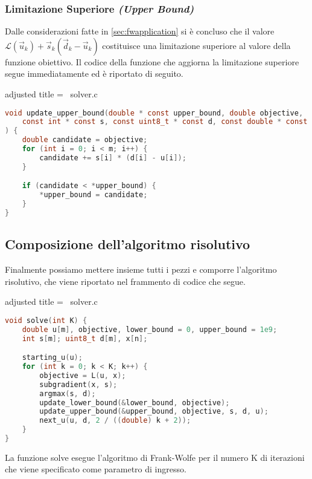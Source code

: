 \subsubsection{Limitazione Superiore \textit{(Upper Bound)}}
Dalle considerazioni fatte in \ref{sec:fwapplication} si è concluso che il valore
\(
    \mathcal{L}(\vec{u}_k) + \vec{s}_k(\vec{d}_k - \vec{u}_k)
\)
costituisce una limitazione superiore al valore della funzione obiettivo. Il codice della funzione che aggiorna la
limitazione superiore segue immediatamente ed è riportato di seguito.

\begin{code}{adjusted title = {\cicon\ solver.c}}
\begin{lstlisting}[language=c, style = style, caption={Aggiornamento della limitazione superiore.}]
void update_upper_bound(double * const upper_bound, double objective,
    const int * const s, const uint8_t * const d, const double * const u
) {
    double candidate = objective;
    for (int i = 0; i < m; i++) {
        candidate += s[i] * (d[i] - u[i]);
    }

    if (candidate < *upper_bound) {
        *upper_bound = candidate;
    }
}
\end{lstlisting}
\end{code}

\subsection{Composizione dell'algoritmo risolutivo}
Finalmente possiamo mettere insieme tutti i pezzi e comporre l'algoritmo risolutivo, che viene riportato nel frammento
di codice che segue.

\begin{code}{adjusted title = {\cicon\ solver.c}}
\begin{lstlisting}[language=c, style = style, caption={Implementazione dell'algoritmo risolutivo.}]
void solve(int K) {
    double u[m], objective, lower_bound = 0, upper_bound = 1e9;
    int s[m]; uint8_t d[m], x[n];

    starting_u(u);
    for (int k = 0; k < K; k++) {
        objective = L(u, x);
        subgradient(x, s);
        argmax(s, d);
        update_lower_bound(&lower_bound, objective);
        update_upper_bound(&upper_bound, objective, s, d, u);
        next_u(u, d, 2 / ((double) k + 2));
    }
}
\end{lstlisting}
\end{code}

\noindent
La funzione {\jbm solve} esegue l'algoritmo di Frank-Wolfe per il numero {\jbm K} di iterazioni che viene specificato
come parametro di ingresso.


